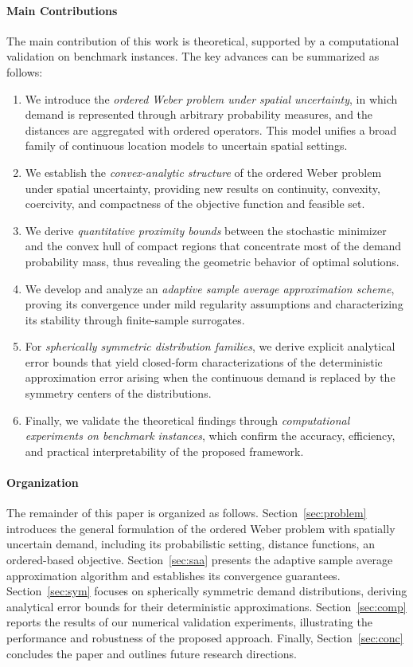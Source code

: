 \documentclass[letter,11pt, reqno]{amsart}
\renewcommand{\;}{\quad}
\theoremstyle{thmstyleone}%
\theoremstyle{thmstyletwo}%
\theoremstyle{thmstylethree}%
\begin{document}
\paragraph{\bf Main Contributions}

The main contribution of this work is theoretical, supported by a computational validation on benchmark instances. The key advances can be summarized as follows:
\begin{enumerate}
\item We introduce the \emph{ordered Weber problem under spatial uncertainty}, in which demand is represented through arbitrary probability measures, and the distances are aggregated with ordered operators. This model unifies a broad family of continuous location models to uncertain spatial settings.
    \item We establish the \emph{convex-analytic structure} of the ordered Weber problem under spatial uncertainty, providing new results on continuity, convexity, coercivity, and compactness of the objective function and feasible set.
    \item We derive \emph{quantitative proximity bounds} between the stochastic minimizer and the convex hull of compact regions that concentrate most of the demand probability mass, thus revealing the geometric behavior of optimal solutions.
    \item We develop and analyze an \emph{adaptive sample average approximation scheme}, proving its convergence under mild regularity assumptions and characterizing its stability through finite-sample surrogates.
    \item For \emph{spherically symmetric distribution families}, we derive explicit analytical error bounds that yield closed-form characterizations of the deterministic approximation error arising when the continuous demand is replaced by the symmetry centers of the distributions.
    \item Finally, we validate the theoretical findings through \emph{computational experiments on benchmark instances}, which confirm the accuracy, efficiency, and practical interpretability of the proposed framework.
\end{enumerate}
\paragraph{\bf Organization}
The remainder of this paper is organized as follows. Section~\ref{sec:problem} introduces the general formulation of the ordered Weber problem with spatially uncertain demand, including its probabilistic setting, distance functions, an ordered-based objective. Section~\ref{sec:saa} presents the adaptive sample average approximation algorithm and establishes its convergence guarantees. Section~\ref{sec:sym} focuses on spherically symmetric demand distributions, deriving analytical error bounds for their deterministic approximations. Section~\ref{sec:comp} reports the results of our numerical validation experiments, illustrating the performance and robustness of the proposed approach. Finally, Section~\ref{sec:conc} concludes the paper and outlines future research directions.
\end{document}

